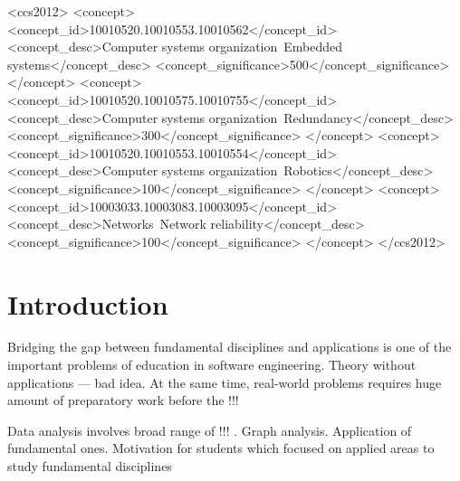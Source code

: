 \documentclass[sigconf]{acmart}
\begin{document}
\begin{CCSXML}
<ccs2012>
 <concept>
  <concept_id>10010520.10010553.10010562</concept_id>
  <concept_desc>Computer systems organization~Embedded systems</concept_desc>
  <concept_significance>500</concept_significance>
 </concept>
 <concept>
  <concept_id>10010520.10010575.10010755</concept_id>
  <concept_desc>Computer systems organization~Redundancy</concept_desc>
  <concept_significance>300</concept_significance>
 </concept>
 <concept>
  <concept_id>10010520.10010553.10010554</concept_id>
  <concept_desc>Computer systems organization~Robotics</concept_desc>
  <concept_significance>100</concept_significance>
 </concept>
 <concept>
  <concept_id>10003033.10003083.10003095</concept_id>
  <concept_desc>Networks~Network reliability</concept_desc>
  <concept_significance>100</concept_significance>
 </concept>
</ccs2012>
\end{CCSXML}




\maketitle

\section{Introduction}

Bridging the gap between fundamental disciplines and applications is one of the important problems of education in software engineering.
Theory without applications --- bad idea.
At the same time, real-world problems requires huge amount of preparatory work before the !!!


Data analysis involves broad range of !!! .
Graph analysis.
Application of fundamental ones.
Motivation for students which focused on applied areas to study fundamental disciplines 
\end{document}
